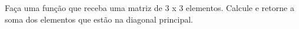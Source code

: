 
\question[10]

Faça uma função que receba uma matriz de 3 x 3 elementos. Calcule e retorne a soma dos elementos que estão na diagonal principal.